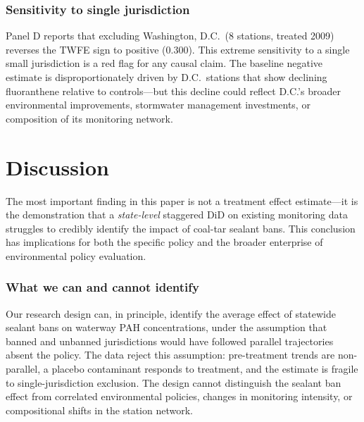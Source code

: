 \documentclass[12pt]{article}
\begin{document}
\subsubsection*{Sensitivity to single jurisdiction} Panel D reports that excluding Washington, D.C.\ (8 stations, treated 2009) reverses the TWFE sign to positive ($0.300$). This extreme sensitivity to a single small jurisdiction is a red flag for any causal claim. The baseline negative estimate is disproportionately driven by D.C.\ stations that show declining fluoranthene relative to controls---but this decline could reflect D.C.'s broader environmental improvements, stormwater management investments, or composition of its monitoring network.

\section{Discussion}

The most important finding in this paper is not a treatment effect estimate---it is the demonstration that a \textit{state-level} staggered DiD on existing monitoring data struggles to credibly identify the impact of coal-tar sealant bans. This conclusion has implications for both the specific policy and the broader enterprise of environmental policy evaluation.

\subsubsection*{What we can and cannot identify} Our research design can, in principle, identify the average effect of statewide sealant bans on waterway PAH concentrations, under the assumption that banned and unbanned jurisdictions would have followed parallel trajectories absent the policy. The data reject this assumption: pre-treatment trends are non-parallel, a placebo contaminant responds to treatment, and the estimate is fragile to single-jurisdiction exclusion. The design cannot distinguish the sealant ban effect from correlated environmental policies, changes in monitoring intensity, or compositional shifts in the station network.
\end{document}
